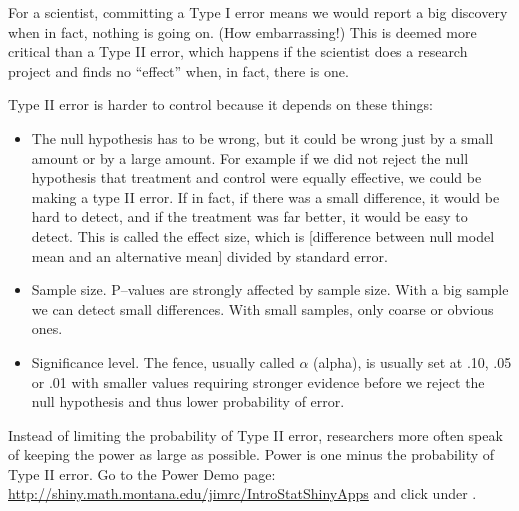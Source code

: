 For a scientist, committing a Type I error means we would report a
big discovery when in fact, nothing is going on. (How embarrassing!)
This is deemed more critical than a Type II error, which happens if
the scientist does a research project and finds no ``effect'' when, in
fact, there is one. 


Type II error is harder to control because it depends on these things:
\vspace{-.2cm}
\begin{itemize}
\item  The null hypothesis has to be wrong, but it could be wrong just
  by a small amount or by a large amount.  For example if 
   we did not reject the null hypothesis that treatment and
  control  were equally effective,  we could be making a type II
  error.  If in fact, if there was a small difference, it would be
  hard to detect, and if the treatment was far better, it would
  be easy to detect.  This is called the effect size, which is
  [difference between null model mean and an alternative mean] divided
  by standard error.
\item  Sample size.  P--values are strongly affected by sample
  size. With a big sample we can detect small differences.  With small
  samples, only coarse or obvious ones.
\item  Significance level.  The fence, usually called $\alpha$ (alpha), is
  usually set at .10, .05 or .01 with smaller values requiring
  stronger evidence before we reject the null hypothesis and thus
  lower probability of error.  
\end{itemize}


Instead of limiting the probability of Type II error, researchers more
often speak of keeping the power as large as possible.  Power is one
minus the probability of Type II error.  Go to the Power Demo page:
\url{http://shiny.math.montana.edu/jimrc/IntroStatShinyApps} and click
 under .
\begin{students}
\vspace{.5cm}
\end{students}


